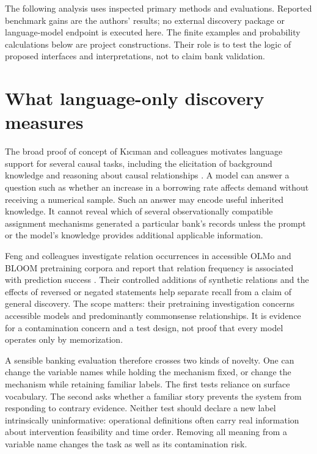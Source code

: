 The following analysis uses inspected primary methods and evaluations. Reported
benchmark gains are the authors' results; no external discovery package or
language-model endpoint is executed here. The finite examples and probability
calculations below are project constructions. Their role is to test the logic
of proposed interfaces and interpretations, not to claim bank validation.

\section{What language-only discovery measures}

The broad proof of concept of K{\i}c{\i}man and colleagues motivates language
support for several causal tasks, including the elicitation of background
knowledge and reasoning about causal relationships
\cite{v12_la_2305_00050}. A model can answer a question such as whether an
increase in a borrowing rate affects demand without receiving a numerical
sample. Such an answer may encode useful inherited knowledge. It cannot reveal
which of several observationally compatible assignment mechanisms generated a
particular bank's records unless the prompt or the model's knowledge provides
additional applicable information.

Feng and colleagues investigate relation occurrences in accessible OLMo and
BLOOM pretraining corpora and report that relation frequency is associated with
prediction success \cite{v12_la_2407_19638}. Their controlled additions of
synthetic relations and the effects of reversed or negated statements help
separate recall from a claim of general discovery. The scope matters: their
pretraining investigation concerns accessible models and predominantly
commonsense relationships. It is evidence for a contamination concern and a
test design, not proof that every model operates only by memorization.

A sensible banking evaluation therefore crosses two kinds of novelty. One can
change the variable names while holding the mechanism fixed, or change the
mechanism while retaining familiar labels. The first tests reliance on
surface vocabulary. The second asks whether a familiar story prevents the
system from responding to contrary evidence. Neither test should declare a
new label intrinsically uninformative: operational definitions often carry
real information about intervention feasibility and time order. Removing all
meaning from a variable name changes the task as well as its contamination risk.

